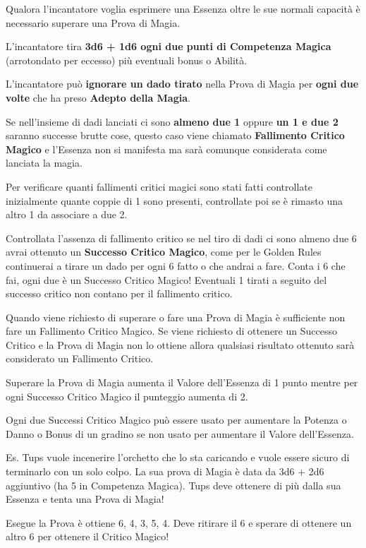 \documentclass[a4paper,twoside,openany]{book}
\begin{document}
\begin{multicols}{2}
Qualora l'incantatore voglia esprimere una Essenza oltre le sue normali capacità è necessario superare una Prova di Magia.

L'incantatore tira \textbf{3d6 + 1d6 ogni due punti di Competenza Magica} (arrotondato per eccesso) più eventuali bonus o Abilità.

L'incantatore può \textbf{ignorare un dado tirato} nella Prova di Magia per \textbf{ogni due volte} che ha preso \textbf{Adepto della Magia}.

Se nell'insieme di dadi lanciati ci sono \textbf{almeno due 1} oppure \textbf{un 1 e due 2} saranno successe brutte cose, questo caso viene chiamato \textbf{Fallimento Critico Magico} e l'Essenza non si manifesta ma sarà comunque considerata come lanciata la magia.

Per verificare quanti fallimenti critici magici sono stati fatti controllate inizialmente quante coppie di 1 sono presenti, controllate poi se è rimasto una altro 1 da associare a due 2.

Controllata l'assenza di fallimento critico se nel tiro di dadi ci sono almeno due 6 avrai ottenuto un \textbf{Successo Critico Magico}, come per le Golden Rules continuerai a tirare un dado per ogni 6 fatto o che andrai a fare. Conta i 6 che fai, ogni due è un Successo Critico Magico! Eventuali 1 tirati a seguito del successo critico non contano per il fallimento critico.

Quando viene richiesto di superare o fare una Prova di Magia è sufficiente non fare un Fallimento Critico Magico. Se viene richiesto di ottenere un Successo Critico e la Prova di Magia non lo ottiene allora qualsiasi risultato ottenuto sarà considerato un Fallimento Critico.

Superare la Prova di Magia aumenta il Valore dell'Essenza di 1 punto mentre per ogni Successo Critico Magico il punteggio aumenta di 2.

Ogni due Successi Critico Magico può essere usato per aumentare la Potenza o Danno o Bonus di un gradino se non usato per aumentare il Valore dell'Essenza.

Es. Tups vuole incenerire l'orchetto che lo sta caricando e vuole essere sicuro di terminarlo con un solo colpo. La sua prova di Magia è data da 3d6 + 2d6 aggiuntivo (ha 5 in Competenza Magica). Tups deve ottenere di più dalla sua Essenza e tenta una Prova di Magia!

Esegue la Prova è ottiene 6, 4, 3, 5, 4. Deve ritirare il 6 e sperare di ottenere un altro 6 per ottenere il Critico Magico!


\end{multicols}
\end{document}
